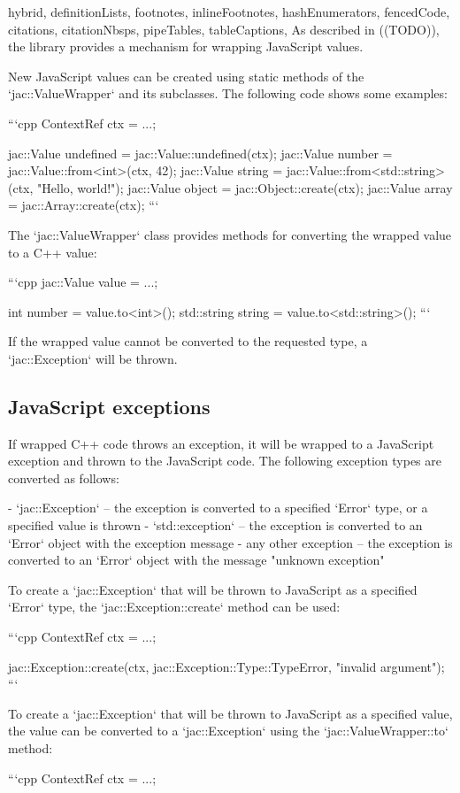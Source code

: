 \documentclass[
  digital,
  oneside,
  nosansbold,
  nocolorbold,
  lof,
  lot
]{fithesis4}
\begin{document}
\begin{markdown*}{%
  hybrid,
  definitionLists,
  footnotes,
  inlineFootnotes,
  hashEnumerators,
  fencedCode,
  citations,
  citationNbsps,
  pipeTables,
  tableCaptions,
}
As described in ((TODO)), the library provides a mechanism for wrapping JavaScript values.

New JavaScript values can be created using static methods of the `jac::ValueWrapper` and its subclasses. The following code shows some examples:

```cpp
ContextRef ctx = ...;

jac::Value undefined = jac::Value::undefined(ctx);
jac::Value number = jac::Value::from<int>(ctx, 42);
jac::Value string = jac::Value::from<std::string>(ctx, "Hello, world!");
jac::Value object = jac::Object::create(ctx);
jac::Value array = jac::Array::create(ctx);
```

The `jac::ValueWrapper` class provides methods for converting the wrapped value to a C++ value:

```cpp
jac::Value value = ...;

int number = value.to<int>();
std::string string = value.to<std::string>();
```

If the wrapped value cannot be converted to the requested type, a `jac::Exception` will be thrown.

\subsection{JavaScript exceptions}

If wrapped C++ code throws an exception, it will be wrapped to a JavaScript exception and thrown to the JavaScript code. The following exception types are converted as follows:

  - `jac::Exception` -- the exception is converted to a specified `Error` type, or a specified value is thrown
  - `std::exception` -- the exception is converted to an `Error` object with the exception message
  - any other exception -- the exception is converted to an `Error` object with the message "unknown exception"

To create a `jac::Exception` that will be thrown to JavaScript as a specified `Error` type, the `jac::Exception::create` method can be used:

```cpp
ContextRef ctx = ...;

jac::Exception::create(ctx, jac::Exception::Type::TypeError, "invalid argument");
```

To create a `jac::Exception` that will be thrown to JavaScript as a specified value, the value can be converted to a `jac::Exception` using the `jac::ValueWrapper::to` method:

```cpp
ContextRef ctx = ...;


\end{markdown*}
\end{document}
